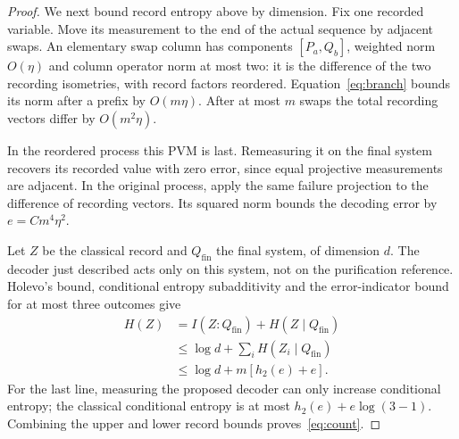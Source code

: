 \begin{proof}
We next bound record entropy above by dimension. Fix one recorded variable. Move its measurement to the end of the actual sequence by adjacent swaps. An elementary swap column has components $[P_a,Q_b]$, weighted norm $O(\eta)$ and column operator norm at most two: it is the difference of the two recording isometries, with record factors reordered. Equation~\eqref{eq:branch} bounds its norm after a prefix by $O(m\eta)$. After at most $m$ swaps the total recording vectors differ by $O(m^2\eta)$.

In the reordered process this PVM is last. Remeasuring it on the final system recovers its recorded value with zero error, since equal projective measurements are adjacent. In the original process, apply the same failure projection to the difference of recording vectors. Its squared norm bounds the decoding error by $e=Cm^4\eta^2$.

Let $Z$ be the classical record and $Q_{\mathrm{fin}}$ the final system, of dimension $d$. The decoder just described acts only on this system, not on the purification reference. Holevo's bound, conditional entropy subadditivity and the error-indicator bound for at most three outcomes give
\begin{align*}
 H(Z)&=I(Z:Q_{\mathrm{fin}})+H(Z\mid Q_{\mathrm{fin}})\\
 &\le\log d+\sum_iH(Z_i\mid Q_{\mathrm{fin}})\\
 &\le\log d+m[h_2(e)+e].
\end{align*}
For the last line, measuring the proposed decoder can only increase conditional entropy; the classical conditional entropy is at most $h_2(e)+e\log(3-1)$. Combining the upper and lower record bounds proves~\eqref{eq:count}.
\end{proof}
